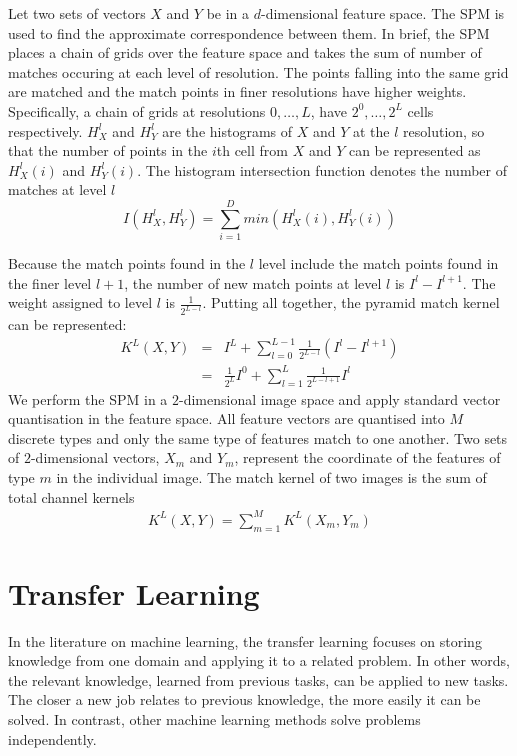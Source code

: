 Let two sets of vectors $X$ and $Y$ be in a $d$-dimensional feature space. The SPM is used to find the approximate correspondence between them. In brief, the SPM places a chain of grids over the feature space and takes the sum of number of matches occuring at each level of resolution. The points falling into the same grid are matched and the match points in finer resolutions have higher weights. Specifically, a chain of grids at resolutions $0,\dotso,L$, have $2^0,\dotso,2^L$ cells respectively. $H_{X}^l$ and $H_{Y}^l$ are the histograms of $X$ and $Y$ at the $l$ resolution, so that the number of points in the $i$th cell from $X$ and $Y$ can be represented as $H_{X}^l(i)$ and $H_{Y}^l(i)$. The histogram intersection function denotes the number of matches at level $l$
\begin{equation}\label{eq:HistInterFunc}
I(H_{X}^l, H_{Y}^l) = \sum_{i=1}^D min(H_{X}^l(i), H_{Y}^l(i))
\end{equation}

Because the match points found in the $l$ level include the match points found in the finer level $l+1$, the number of new match points at level $l$ is $I^l - I^{l+1}$. The weight assigned to level $l$ is $\frac{1}{2^{L-l}}$. Putting all together, the pyramid match kernel can be represented:
\begin{eqnarray}\label{eq:PyramidChanMatchKernel}
  K^L(X,Y) & = & I^L + \sum_{l=0}^{L-1} \frac{1}{2^{L-l}}(I^l-I^{l+1})\\
 & = & \frac{1}{2^L}I^0 + \sum_{l=1}^{L}\frac{1}{2^{L-l+1}}I^l
\end{eqnarray}
We perform the SPM in a $2$-dimensional image space and apply standard vector quantisation in the feature space. All feature vectors are quantised into $M$ discrete types and only the same type of features match to one another. Two sets of $2$-dimensional vectors, $X_m$ and $Y_m$, represent the coordinate of the features of type $m$ in the individual image. The match kernel of two images is the sum of total channel kernels
\begin{eqnarray}\label{eq:PyramidMatchKernel}
  K^L(X,Y) = \sum_{m=1}^{M} K^L(X_m, Y_m)
\end{eqnarray}

\section{Transfer Learning}

In the literature on machine learning, the transfer learning\citep{pan2010survey} focuses on storing knowledge from one domain and applying it to a related problem. In other words, the relevant knowledge, learned from previous tasks, can be applied to new tasks. The closer a new job relates to previous knowledge, the more easily it can be solved. In contrast, other machine learning methods solve problems independently. 


